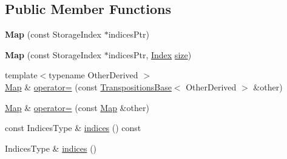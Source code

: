\subsection*{Public Member Functions}
\begin{DoxyCompactItemize}
\item 
\mbox{\label{class_eigen_1_1_map_3_01_transpositions_3_01_size_at_compile_time_00_01_max_size_at_compile_timecc993082d7c0ba51ca94b27e97da8dd3_a3c4be558224760d052bfb9ec2d10c40f}} 
{\bfseries Map} (const Storage\+Index $\ast$indices\+Ptr)
\item 
\mbox{\label{class_eigen_1_1_map_3_01_transpositions_3_01_size_at_compile_time_00_01_max_size_at_compile_timecc993082d7c0ba51ca94b27e97da8dd3_ad37331d919ec50860540347c770106ec}} 
{\bfseries Map} (const Storage\+Index $\ast$indices\+Ptr, \mbox{\hyperlink{class_eigen_1_1_transpositions_base_a3f5f06118b419e8e6ccbe49ed5b4c91f}{Index}} \mbox{\hyperlink{class_eigen_1_1_transpositions_base_a6888d6261a9cc24ee8607496e610a5a3}{size}})
\item 
{\footnotesize template$<$typename Other\+Derived $>$ }\\\mbox{\hyperlink{class_eigen_1_1_map}{Map}} \& \mbox{\hyperlink{class_eigen_1_1_map_3_01_transpositions_3_01_size_at_compile_time_00_01_max_size_at_compile_timecc993082d7c0ba51ca94b27e97da8dd3_a903d189a8b363033ec9b1cba0190b11b}{operator=}} (const \mbox{\hyperlink{class_eigen_1_1_transpositions_base}{Transpositions\+Base}}$<$ Other\+Derived $>$ \&other)
\item 
\mbox{\hyperlink{class_eigen_1_1_map}{Map}} \& \mbox{\hyperlink{class_eigen_1_1_map_3_01_transpositions_3_01_size_at_compile_time_00_01_max_size_at_compile_timecc993082d7c0ba51ca94b27e97da8dd3_aaafbdb07fbd22f5ac9171e6b03d783f4}{operator=}} (const \mbox{\hyperlink{class_eigen_1_1_map}{Map}} \&other)
\item 
const Indices\+Type \& \mbox{\hyperlink{class_eigen_1_1_map_3_01_transpositions_3_01_size_at_compile_time_00_01_max_size_at_compile_timecc993082d7c0ba51ca94b27e97da8dd3_a08d5e1dd2e82fc92b82873bf740e4f24}{indices}} () const
\item 
Indices\+Type \& \mbox{\hyperlink{class_eigen_1_1_map_3_01_transpositions_3_01_size_at_compile_time_00_01_max_size_at_compile_timecc993082d7c0ba51ca94b27e97da8dd3_a1f8c96b93122a0e3237a05c11e8812c5}{indices}} ()
\end{DoxyCompactItemize}
